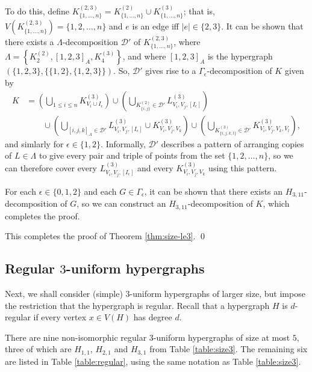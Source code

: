 To do this, define $K_{\{1,\ldots,n\}}^{(2,3)} = K_{\{1,\ldots,n\}}^{(2)} \cup K_{\{1,\ldots,n\}}^{(3)}$; that is, $V(K_{\{1,\ldots,n\}}^{(2,3)}) = \{1,2,\ldots,n\}$ and $e$ is an edge iff $|e| \in \{2,3\}$.
It can be shown that there exists a $\Lambda$-decomposition $\mathcal{D}'$ of $K_{\{1,\ldots,n\}}^{(2,3)}$,
where $\Lambda = \left\{ K_{2}^{(2)}, [1,2,3]_A, K_{4}^{(3)} \right\}$, and where $[1,2,3]_A$ is the hypergraph $(\{1,2,3\}, \{\{1,2\},\{1,2,3\}\})$.
So, $\mathcal{D}'$ gives rise to a $\Gamma_\epsilon$-decomposition of $K$ given by
\begin{align*}
    K &= \left( \bigcup_{1 \leq i \leq n} K_{V_i \cup I_\epsilon}^{(3)} \right)
    \cup \left( \bigcup_{K_{\{i,j\}}^{(2)} \in \mathcal{D}'} L_{V_i,V_j,[I_\epsilon]}^{(3)} \right)
    \\ & \quad \quad
    \cup \left( \bigcup_{[i,j,k]_A \in \mathcal{D}'} L_{V_i,V_j,[I_\epsilon]}^{(3)} \cup K_{V_i,V_j,V_k}^{(3)} \right)
    \cup \left( \bigcup_{K_{\{i,j,k,l\}}^{(3)} \in \mathcal{D}'} K_{V_i,V_j,V_k,V_l}^{(3)} \right),
\end{align*}
and simlarly for $\epsilon \in \{1,2\}$.
Informally, $\mathcal{D}'$ describes a pattern of arranging copies of $L \in \Lambda$ to give every pair and triple of points from the set $\{1,2,\ldots,n\}$,
so we can therefore cover every $L_{V_i, V_j, [I_\epsilon]}^{(3)}$ and every $K_{V_i, V_j, V_k}^{(3)}$ using this pattern.

For each $\epsilon \in \{0,1,2\}$ and each $G \in \Gamma_\epsilon$, it can be shown that there exists an $H_{3,11}$-decomposition of $G$,
so we can construct an $H_{3,11}$-decomposition of $K$, which completes the proof.

This completes the proof of Theorem \ref{thm:size-le3}. \qed

\subsection{Regular $3$-uniform hypergraphs}

Next, we shall consider (simple) $3$-uniform hypergraphs of larger size, but impose the restriction that the hypergraph is regular.
Recall that a hypergraph $H$ is $d$-regular if every vertex $x \in V(H)$ has degree $d$.

There are nine non-isomorphic regular $3$-uniform hypergraphs of size at most $5$, three of which are $H_{1,1}$, $H_{2,1}$ and $H_{3,1}$ from Table \ref{table:size3}.
The remaining six are listed in Table \ref{table:regular}, using the same notation as Table \ref{table:size3}.

